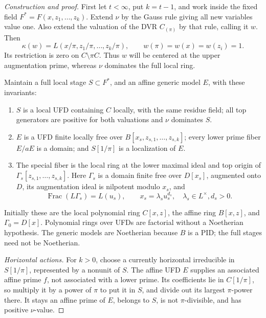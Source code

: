 \documentclass[10pt,a4paper]{amsart}
\begin{document}
\begin{proof}[Construction and proof]
First let \(t<\infty\), put \(k=t-1\), and work inside the
fixed field \(F^*=F(x,z_1,\ldots,z_k)\).  Extend \(\nu\)
by the Gauss rule giving all new variables value one.  Also
extend the valuation of the DVR \(C_{(\pi)}\) by that rule,
calling it \(w\).  Then
\begin{equation}\label{eq:relative-gauss}
\kappa(w)=L(x/\pi,z_1/\pi,\ldots,z_k/\pi),
 \qquad w(\pi)=w(x)=w(z_i)=1.
\end{equation}
Its restriction is zero on \(C\setminus\pi C\).  Thus \(w\)
will be centered at the upper augmentation prime, whereas
\(\nu\) dominates the full local ring.

Maintain a full local stage \(S\subset F^*\), and an affine
generic model \(E\), with these invariants:
\begin{enumerate}[label=(\roman*)]
\item \(S\) is a local UFD containing \(C\) locally, with the
same residue field; all top generators are positive for both
valuations and \(\nu\) dominates \(S\).
\item \(E\) is a UFD finite locally free over
\(B[x_s,z_{s,1},\ldots,z_{s,k}]\); every lower prime fiber
\(E/aE\) is a domain; and \(S[1/\pi]\) is a localization of \(E\).
\item The special fiber is the local ring at the lower maximal
ideal and top origin of \(\Gamma_s[z_{s,1},\ldots,z_{s,k}]\).
Here \(\Gamma_s\) is a domain finite free over \(D[x_s]\),
augmented onto \(D\), its augmentation ideal is nilpotent
modulo \(x_s\), and
\[
 \operatorname{Frac}(L\Gamma_s)=L(u_s),\qquad
 x_s=\lambda_su_s^{d_s},\quad \lambda_s\in L^\times, d_s>0.
\]
\end{enumerate}
Initially these are the local polynomial ring \(C[x,z]\), the
affine ring \(B[x,z]\), and \(\Gamma_0=D[x]\).  Polynomial
rings over UFDs are factorial without a Noetherian hypothesis.
The generic models are Noetherian because \(B\) is a PID; the
full stages need not be Noetherian.

\smallskip\noindent\emph{Horizontal actions.}
For \(k>0\), choose a currently horizontal irreducible in
\(S[1/\pi]\), represented by a nonunit of \(S\).  The affine
UFD \(E\) supplies an associated affine prime \(f\), not
associated with a lower prime.  Its coefficients lie in
\(C[1/\pi]\), so multiply it by a power of \(\pi\) to put
it in \(S\), and divide out its largest \(\pi\)-power there.
It stays an affine prime of \(E\), belongs to \(S\), is not
\(\pi\)-divisible, and has positive \(\nu\)-value.


\end{proof}
\end{document}
